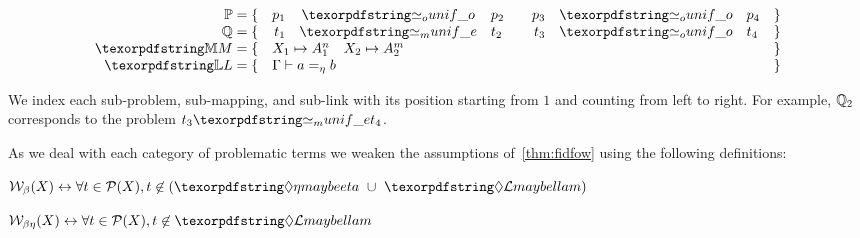 % 

$$
\begin{array}{rrclrcll}
\foUnifPb = \{ & p_1 & \Uo & p_2 \quad & p_3 & \Uo & p_4 & \}\\
\hoUnifPb = \{ & t_1 & \Ue & t_2 \quad & t_3 & \Uo & t_4 & \}\\
\mapStore = \{ & \multicolumn{6}{l}{X_1 \mapsto A_{1}^n \quad X_2 \mapsto A_{2}^m} & \}\\
\linkStore = \{ & \multicolumn{6}{l}{ \Gamma \vdash a =_{\eta} b} & \}\\
\end{array}
$$


  \noindent
We index each sub-problem, sub-mapping, and sub-link with its position
starting from $1$ and counting from left to right.
For example, $\mathbb{Q}_2$ corresponds to the \Ho problem $t_3 \Ue t_4$.

As we deal with each category of problematic terms we
weaken the assumptions of~\cref{thm:fidfow} using the following
definitions:

\begin{definition}[$\wellb_\beta$]
  $
  \wellb_\beta(X) \leftrightarrow \forall t \in \subterm{X}, t \not\in (\maybeeta{} ~\cup~ \notllambda{})
  $
  \end{definition}
  
\begin{definition}[$\wellb_{\beta \eta}$]
  $
  \wellb_{\beta \eta}(X) \leftrightarrow \forall t \in \subterm{X}, t \not\in \notllambda{}
  $
\end{definition}






